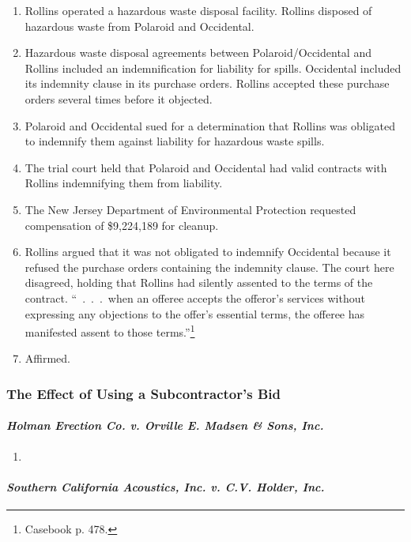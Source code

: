 \begin{enumerate}
    \item Rollins operated a hazardous waste disposal facility. Rollins 
    disposed of hazardous waste from Polaroid and Occidental.
    \item Hazardous waste disposal agreements between Polaroid/Occidental and 
    Rollins included an indemnification for liability for spills. Occidental 
    included its indemnity clause in its purchase orders. Rollins accepted 
    these purchase orders several times before it objected.
    \item Polaroid and Occidental sued for a determination that Rollins was 
    obligated to indemnify them against liability for hazardous waste spills. 
    \item The trial court held that Polaroid and Occidental had valid 
    contracts with Rollins indemnifying them from liability.
    \item The New Jersey Department of Environmental Protection requested 
    compensation of \$9,224,189 for cleanup.
    \item Rollins argued that it was not obligated to indemnify Occidental 
    because it refused the purchase orders containing the indemnity clause. 
    The court here disagreed, holding that Rollins had silently assented to 
    the terms of the contract. ``~.~.~.~when an offeree accepts the offeror's 
    services without expressing any objections to the offer's essential terms, 
    the offeree has manifested assent to those terms.''\footnote{Casebook p. 
    478.}
    \item Affirmed.
\end{enumerate}

\subsubsection{The Effect of Using a Subcontractor's Bid}

\paragraph{\emph{Holman Erection Co. v. Orville E. Madsen \& Sons, Inc.}}

\begin{enumerate}
    \item %
\end{enumerate}

\paragraph{\emph{Southern California Acoustics, Inc. v. C.V. Holder, Inc.}}

